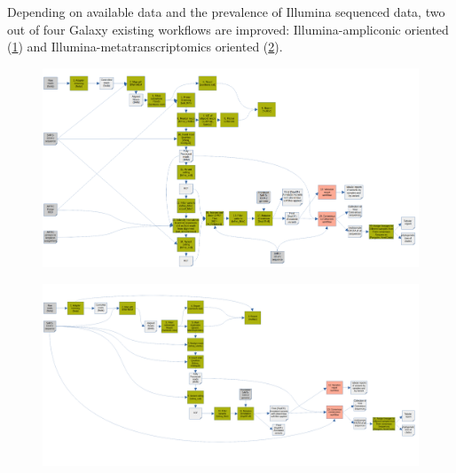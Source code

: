         Depending on available data and the prevalence of Illumina sequenced data, two out of four Galaxy existing workflows are improved: Illumina-ampliconic oriented (\cref{fig:methods:artic-wf}) and Illumina-metatranscriptomics oriented (\cref{fig:methods:wgs-wf}). 
        \begin{landscape}
        \centering\vspace*{\fill}
        \begin{figure}[ht!]
            \centering
            \includegraphics[width=1.4\textwidth]{figures/methods/artic-wf-before.png}
            \label{fig:methods:artic-wf}
        \end{figure}
        \begin{figure}[ht!]
            \centering
            \includegraphics[width=1.4\textwidth]{figures/methods/metatranscriptomics-wf-before.png}
            \label{fig:methods:wgs-wf}
        \end{figure}
        \vfill
        \end{landscape}
        
